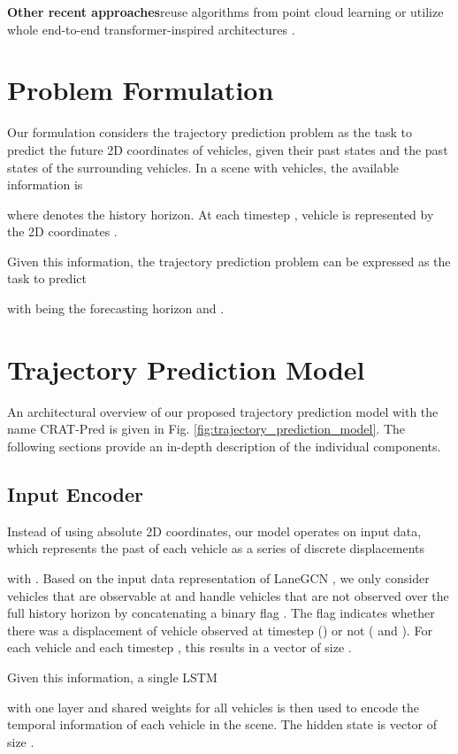 \documentclass[letterpaper, 10 pt, conference]{ieeeconf}
\begin{document}
\textbf{Other recent approaches}\quad reuse algorithms from point cloud learning \cite{Ye2021} or utilize whole end-to-end transformer-inspired architectures \cite{Liu2021}.

\section{Problem Formulation}
Our formulation considers the trajectory prediction problem as the task to predict the future 2D coordinates of vehicles, given their past states and the past states of the surrounding vehicles.
In a scene with  vehicles, the available information is

where  denotes the history horizon.
At each timestep , vehicle  is represented by the 2D coordinates .

Given this information, the trajectory prediction problem can be expressed as the task to predict

with  being the forecasting horizon and .

\section{Trajectory Prediction Model}
An architectural overview of our proposed trajectory prediction model with the name CRAT-Pred is given in Fig. \ref{fig:trajectory_prediction_model}.
The following sections provide an in-depth description of the individual components.

\subsection{Input Encoder}
Instead of using absolute 2D coordinates, our model operates on input data, which represents the past of each vehicle  as a series of discrete displacements

with .
Based on the input data representation of LaneGCN \cite{Liang2020}, we only consider vehicles that are observable at  and handle vehicles that are not observed over the full history horizon  by concatenating a binary flag .
The flag indicates whether there was a displacement of vehicle  observed at timestep  () or not ( and ).
For each vehicle  and each timestep , this results in a vector  of size .

Given this information, a single LSTM

with one layer and shared weights for all vehicles is then used to encode the temporal information of each vehicle in the scene.
The hidden state  is vector of size .
\end{document}
